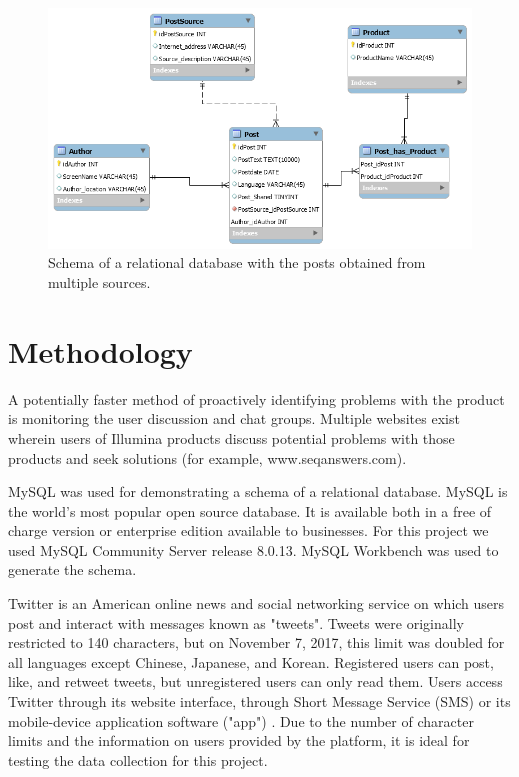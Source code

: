 \documentclass[10pt]{IEEEtran}
\begin{document}
\begin{figure} 
\centering
\includegraphics[width=6.5in]{db.png} 
\caption{Schema of a relational database with the posts obtained from multiple sources.}
\label{fig_db} 
\end{figure}

\section{Methodology}

A potentially faster method of proactively identifying problems with the product is monitoring the user discussion and chat groups.  Multiple websites exist wherein users of Illumina products discuss potential problems with those products and seek solutions (for example, www.seqanswers.com). 

 MySQL was used for demonstrating a schema of a relational database. MySQL is the world's most popular open source database. It is available both in a free of charge version or enterprise edition available to businesses\cite{mysql}. For this project we used MySQL Community Server release 8.0.13. MySQL Workbench was used to generate the schema.


Twitter is an American online news and social networking service on which users post and interact with messages known as "tweets". Tweets were originally restricted to 140 characters, but on November 7, 2017, this limit was doubled for all languages except Chinese, Japanese, and Korean. Registered users can post, like, and retweet tweets, but unregistered users can only read them. Users access Twitter through its website interface, through Short Message Service (SMS) or its mobile-device application software ("app") \cite{wiki-twitter, twitter}. Due to the number of character limits and the information on users provided by the platform, it is ideal for testing the data collection for this project. 
\end{document}
